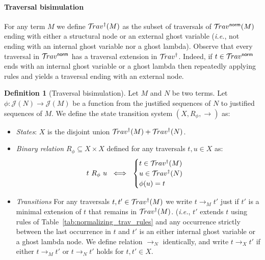 \documentclass{article}
\makeatletter
\theoremstyle{plain}
\theoremstyle{definition}
\newtheorem{definition}{Definition}[section]
\theoremstyle{remark}
\newcommand{\normalizing}{{\sf norm}}
\newcommand{\travsetnorm}{\travset^\normalizing}
\renewcommand\ie{{\it i.e.\@\xspace}}
\def\justseqset{\mathcal{J}}
\makeatother
\begin{document}
\paragraph{Traversal bisimulation}

For any term $M$ we define $\mathcal{T}\!rav^\dagger(M)$ as the subset of traversals of $\travsetnorm(M)$ ending
with either a structural node or an external ghost variable (\ie, not ending with an internal ghost variable nor a ghost lambda).
Observe that every traversal in $\travsetnorm$ has a traversal extension in $\mathcal{T}\!rav^\dagger$.
Indeed, if $t \in \travsetnorm$ ends with an internal ghost variable or a ghost lambda then repeatedly applying
rules  and  yields a traversal ending with an external node.

\begin{definition}[Traversal bisimulation]
\label{def:bisimilar_terms}
Let $M$ and $N$ be two terms. Let $\phi\colon \justseqset(N) \rightarrow\justseqset(M)$ be a function from the justified sequences of $N$ to justified sequences of $M$. We define the state transition system $(X, R_\phi, \rightarrow)$ as:
\begin{itemize}
    \item \emph{States}: $X$ is the disjoint union $\mathcal{T}\!rav^\dagger(M) + \mathcal{T}\!rav^\dagger(N)$.

    \item \emph{Binary relation $R_\phi\subseteq X \times X$} defined for any traversals $t, u \in X$ as:
    $$ t~R_\phi~u  \ \iff \ \begin{cases}
        t\in\mathcal{T}\!rav^\dagger(M)\\
         u\in\mathcal{T}\!rav^\dagger(N) \\
         \phi(u) = t
    \end{cases}
    $$

    \item \emph{Transitions} For any traversals $t, t' \in \mathcal{T}\!rav^\dagger(M)$ we write $t \rightarrow_M t'$ just if $t'$ is a minimal extension of $t$ that remains in $\mathcal{T}\!rav^\dagger(M)$. (\ie, $t'$ extends $t$ using rules of Table~\ref{tab:normalizing_trav_rules} and any occurrence strictly between the last occurrence in $t$ and $t'$ is an either internal ghost variable or a ghost lambda node. We define relation $\rightarrow_N$  identically, and write $t \rightarrow_X t'$ if either $t \rightarrow_M t'$ or $t \rightarrow_N t'$ holds for $t, t' \in X$.
\end{itemize}


\end{definition}
\end{document}
